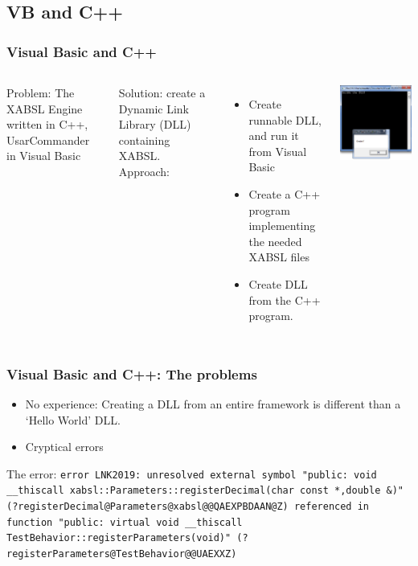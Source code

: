 \documentclass{beamer}
\newcommand{\slide}[2]
{
\begin{frame}
\frametitle{#1} 

#2

\end{frame}
}
\begin{document}
\subsection{VB and C++}
\slide{Visual Basic and C++}
{
    \begin{columns}
    \column{.5\textwidth}
    Problem: The XABSL Engine written in C++, UsarCommander in Visual Basic
    
    Solution: create a Dynamic Link Library (DLL) containing XABSL.
    Approach:
    \begin{itemize}
        \item Create runnable DLL, and run it from Visual Basic
        \item Create a C++ program implementing the needed XABSL files
        \item Create DLL from the C++ program.
    \end{itemize}
    \column{.5\textwidth}
    \includegraphics[width=\columnwidth]{dll.png}
    \end{columns}
}
\slide{Visual Basic and C++: The problems}
{
    \begin{itemize}
        \item No experience: Creating a DLL from an entire framework is
        different than a `Hello World' DLL.
        \item Cryptical errors
    \end{itemize}
    \begin{block}{The error:}
    \texttt{error LNK2019: unresolved external symbol "public: void \_\_thiscall
    xabsl::Parameters::registerDecimal(char const *,double \&)"
    (?registerDecimal@Parameters@xabsl@@QAEXPBDAAN@Z) referenced in function
    "public: virtual void \_\_thiscall TestBehavior::registerParameters(void)"
    (?registerParameters@TestBehavior@@UAEXXZ)}
    \end{block}
}
\end{document}
